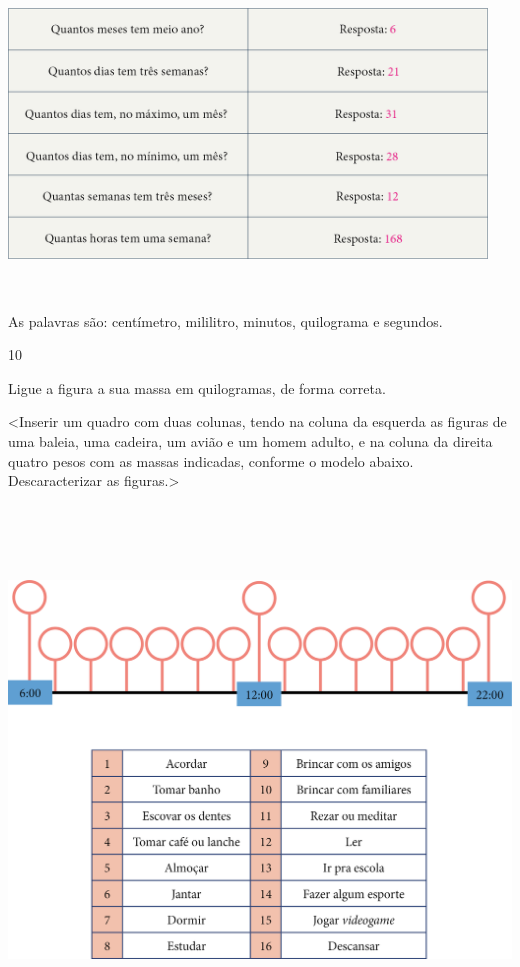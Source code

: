 {\includegraphics[width=5.00000in,height=3.32292in]{media/image50.png}

As palavras são: centímetro, mililitro, minutos, quilograma e segundos.

\num{10}

Ligue a figura a sua massa em quilogramas, de forma correta.

\textless{}Inserir um quadro com duas colunas, tendo na coluna da
esquerda as figuras de uma baleia, uma cadeira, um avião e um homem
adulto, e na coluna da direita quatro pesos com as massas indicadas,
conforme o modelo abaixo. Descaracterizar as figuras.\textgreater{}

\includegraphics[width=5.28125in,height=5.51714in]{media/image51.png}

}
